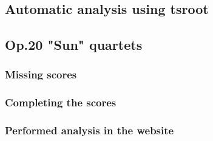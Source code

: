   \subsection{Automatic analysis using tsroot}
  \subsection{Op.20 "Sun" quartets}
    \subsubsection{Missing scores}
    \subsubsection{Completing the scores}
    \subsubsection{Performed analysis in the website}
